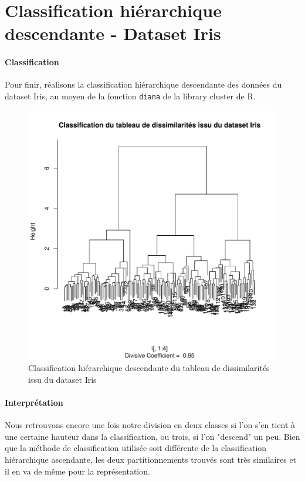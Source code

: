\documentclass{report}
\begin{document}
\section{Classification hiérarchique descendante - Dataset Iris}
\paragraph{Classification}
Pour finir, réalisons la classification hiérarchique descendante des données du dataset Iris, au moyen de la fonction \verb+diana+ de la library cluster de R.
\begin{figure}[ht!]
\begin{center}
    \includegraphics[width=\textwidth]{../plots/E2Q3_diani.pdf}
    \caption{Classification hiérarchique descendante du tableau de dissimilarités issu du dataset Iris}
\end{center}
\end{figure}
\newpage
\paragraph{Interprétation}
Nous retrouvons encore une fois notre division en deux classes si l'on s'en tient à une certaine hauteur dans la classification, ou trois, si l'on "descend" un peu. Bien que la méthode de classification utilisée soit différente de la classification hiérarchique ascendante, les deux partitionnements trouvés sont très similaires et il en va de même pour la représentation.
\newpage
\end{document}
